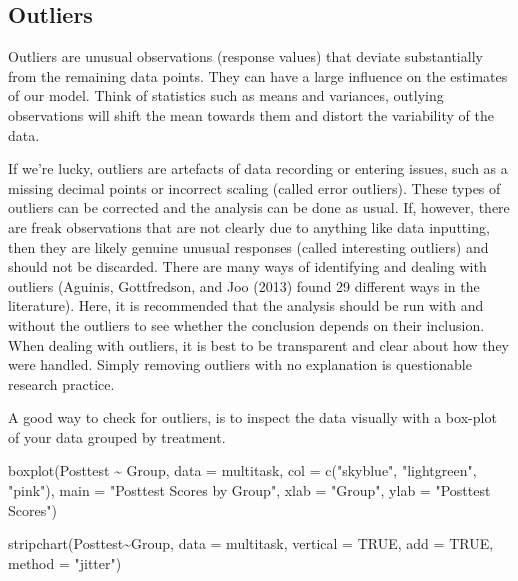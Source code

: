\documentclass[
  letterpaper,
]{book}
\newenvironment{Shaded}{\begin{snugshade}}{\end{snugshade}}
\newcommand{\AttributeTok}[1]{\textcolor[rgb]{0.40,0.45,0.13}{#1}}
\newcommand{\ConstantTok}[1]{\textcolor[rgb]{0.56,0.35,0.01}{#1}}
\newcommand{\FunctionTok}[1]{\textcolor[rgb]{0.28,0.35,0.67}{#1}}
\newcommand{\NormalTok}[1]{\textcolor[rgb]{0.00,0.23,0.31}{#1}}
\newcommand{\SpecialCharTok}[1]{\textcolor[rgb]{0.37,0.37,0.37}{#1}}
\newcommand{\StringTok}[1]{\textcolor[rgb]{0.13,0.47,0.30}{#1}}
\begin{document}
\subsection*{Outliers}\label{outliers}

Outliers are unusual observations (response values) that deviate
substantially from the remaining data points. They can have a large
influence on the estimates of our model. Think of statistics such as
means and variances, outlying observations will shift the mean towards
them and distort the variability of the data.

If we're lucky, outliers are artefacts of data recording or entering
issues, such as a missing decimal points or incorrect scaling (called
error outliers). These types of outliers can be corrected and the
analysis can be done as usual. If, however, there are freak observations
that are not clearly due to anything like data inputting, then they are
likely genuine unusual responses (called interesting outliers) and
should not be discarded. There are many ways of identifying and dealing
with outliers (Aguinis, Gottfredson, and Joo (2013) found 29 different
ways in the literature). Here, it is recommended that the analysis
should be run with and without the outliers to see whether the
conclusion depends on their inclusion. When dealing with outliers, it is
best to be transparent and clear about how they were handled. Simply
removing outliers with no explanation is questionable research practice.

A good way to check for outliers, is to inspect the data visually with a
box-plot of your data grouped by treatment.

\begin{Shaded}
\begin{Highlighting}[]
\FunctionTok{boxplot}\NormalTok{(Posttest }\SpecialCharTok{\textasciitilde{}}\NormalTok{ Group, }\AttributeTok{data =}\NormalTok{ multitask, }\AttributeTok{col =} \FunctionTok{c}\NormalTok{(}\StringTok{"skyblue"}\NormalTok{, }\StringTok{"lightgreen"}\NormalTok{, }\StringTok{"pink"}\NormalTok{), }
        \AttributeTok{main =} \StringTok{"Posttest Scores by Group"}\NormalTok{, }
        \AttributeTok{xlab =} \StringTok{"Group"}\NormalTok{, }
        \AttributeTok{ylab =} \StringTok{"Posttest Scores"}\NormalTok{)}

\FunctionTok{stripchart}\NormalTok{(Posttest}\SpecialCharTok{\textasciitilde{}}\NormalTok{Group, }\AttributeTok{data =}\NormalTok{ multitask, }\AttributeTok{vertical =} \ConstantTok{TRUE}\NormalTok{, }\AttributeTok{add =} \ConstantTok{TRUE}\NormalTok{, }\AttributeTok{method =} \StringTok{"jitter"}\NormalTok{)}
\end{Highlighting}
\end{Shaded}
\end{document}
